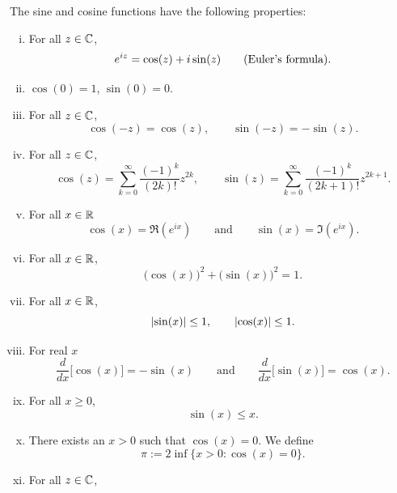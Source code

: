 \pagebreak[2]
\begin{prop}
The sine and cosine functions have the following properties:
\begin{enumerate}[(i)]
\item For all $z \in {\mathbb{C}}$,
\begin{equation*}
e^{iz} = \cos(z) + i\sin(z) \qquad
\text{(\myindex{Euler's formula})}.
\end{equation*}
\item $\cos(0) = 1$, $\sin(0) = 0$.
\item For all $z \in {\mathbb{C}}$,
\begin{equation*}
\cos(-z) = \cos(z), \qquad
\sin(-z) = -\sin(z).
\end{equation*}
\item For all $z \in {\mathbb{C}}$,
\begin{equation*}
\cos(z) = \sum_{k=0}^\infty \frac{{(-1)}^k}{(2k)!} z^{2k} ,
\qquad
\sin(z) = \sum_{k=0}^\infty \frac{{(-1)}^k}{(2k+1)!} z^{2k+1} .
\end{equation*}
\item For all $x \in {\mathbb{R}}$
\begin{equation*}
\cos(x) = \Re (e^{ix})
\qquad\text{and}\qquad
\sin(x) = \Im (e^{ix}) .
\end{equation*}
\item For all $x \in {\mathbb{R}}$,
\begin{equation*}
{\bigl( \cos(x) \bigr)}^2 + {\bigl( \sin(x) \bigr)}^2 = 1 .
\end{equation*}
\item For all $x \in {\mathbb{R}}$,
\begin{equation*}
\lvert {\sin(x)} \rvert \leq 1, \qquad \lvert {\cos(x)} \rvert \leq 1 .
\end{equation*}
\item For real $x$
\begin{equation*}
\frac{d}{dx} \bigl[ \cos(x) \bigr] = -\sin(x)
\qquad \text{and} \qquad
\frac{d}{dx} \bigl[ \sin(x) \bigr] = \cos(x) .
\end{equation*}
\item For all $x \geq 0$,
\begin{equation*}
\sin(x) \leq x .
\end{equation*}
\item
There exists an $x > 0$ such that $\cos(x) = 0$.  We define
\begin{equation*}
\pi := 2 \inf \{ x > 0 : \cos(x) = 0 \} .
\end{equation*}
\item
For all $z \in {\mathbb{C}}$, 

\end{enumerate}
\end{prop}
